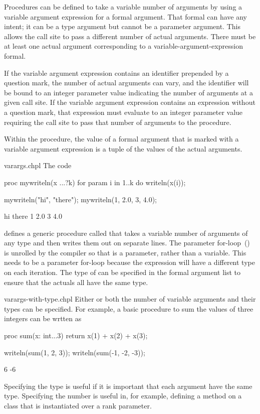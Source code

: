 Procedures can be defined to take a variable number of arguments
by using a variable argument expression for a formal argument.
That formal can have any intent; it can be a type argument
but cannot be a parameter argument.
This allows the call site to
pass a different number of actual arguments.  There must be at least
one actual argument corresponding to a variable-argument-expression formal.

If the variable argument expression contains an identifier prepended by a
question mark, the number of actual arguments can vary, and the identifier
will be bound to an integer parameter value indicating the number of
arguments at a given call site.
If the variable argument expression contains an expression without
a question mark, that expression must evaluate to an integer parameter value
requiring the call site to pass that number of arguments to the
procedure.

Within the procedure, the value of a formal argument that is marked with a
variable argument expression is a tuple of the values of the actual arguments.

\begin{chapelexample}{varargs.chpl}
The code
\begin{chapel}
proc mywriteln(x ...?k) {
  for param i in 1..k do
    writeln(x(i));
}
\end{chapel}
\begin{chapelpost}
mywriteln("hi", "there");
mywriteln(1, 2.0, 3, 4.0);
\end{chapelpost}
\begin{chapeloutput}
hi
there
1
2.0
3
4.0
\end{chapeloutput}
defines a generic procedure called  that takes a
variable number of arguments of any type and then writes them out on
separate lines.  The parameter for-loop~()
is unrolled by the compiler so that  is a parameter, rather
than a variable.  This needs to be a parameter for-loop because the
expression  will have a different type on each iteration.
The type of  can be specified in the formal argument list to
ensure that the actuals all have the same type.
\end{chapelexample}

\begin{chapelexample}{varargs-with-type.chpl}
Either or both the number of variable arguments and their types can be
specified.  For example, a basic procedure to sum the values of three
integers can be wrtten as
\begin{chapel}
proc sum(x: int...3) return x(1) + x(2) + x(3);
\end{chapel}
\begin{chapelpost}
writeln(sum(1, 2, 3));
writeln(sum(-1, -2, -3));
\end{chapelpost}
\begin{chapeloutput}
6
-6
\end{chapeloutput}
Specifying the type is useful if it is important that each argument
have the same type.  Specifying the number is useful in, for example,
defining a method on a class that is instantiated over a rank
parameter.
\end{chapelexample}

